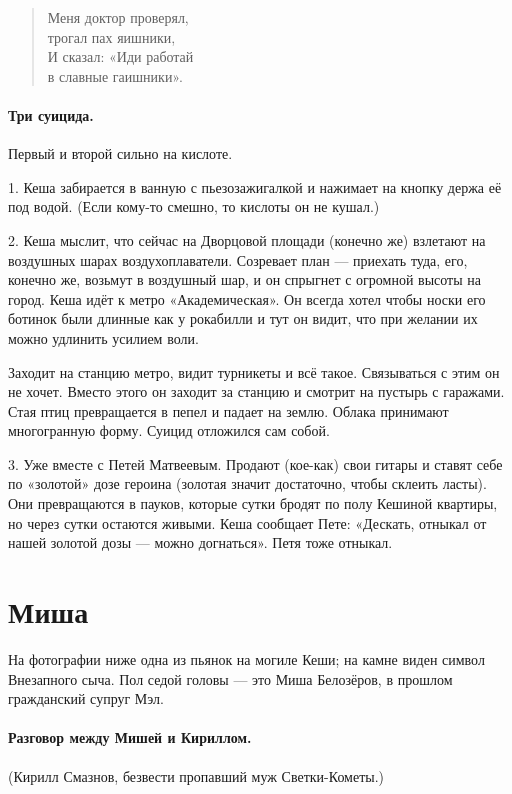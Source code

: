 \documentclass{book}
\begin{document}
\begin{verse}
Меня доктор проверял,\\
\quad  трогал пах яишники,\\
И сказал: «Иди работай\\
\quad в славные гаишники».
\end{verse}


\paragraph{Три суицида.}
Первый и второй сильно на кислоте.

1. Кеша забирается в ванную с пьезозажигалкой и нажимает на кнопку держа её под водой.
(Если кому-то смешно, то кислоты он не кушал.)

2. Кеша мыслит, что сейчас на Дворцовой площади (конечно же) взлетают на воздушных шарах воздухоплаватели.
Созревает план --- приехать туда, его, конечно же, возьмут в воздушный шар, и он спрыгнет с огромной высоты на город.
Кеша идёт к метро «Академическая».
Он всегда хотел чтобы носки его ботинок были длинные как у рокабилли и тут он видит, что при желании их можно удлинить усилием воли.

Заходит на станцию метро, видит турникеты и всё такое.
Связываться с этим он не хочет.
Вместо этого он заходит за станцию и смотрит на пустырь с гаражами.
Стая птиц превращается в пепел и падает на землю.
Облака принимают многогранную форму.
Суицид отложился сам собой.

3. Уже вместе с Петей Матвеевым.
Продают (кое-как) свои гитары и ставят себе по «золотой» дозе героина (золотая значит достаточно, чтобы склеить ласты).
Они превращаются в пауков, которые сутки бродят по полу Кешиной квартиры, но через сутки остаются живыми.
Кеша сообщает Пете: «Дескать, отныкал от нашей золотой дозы --- можно догнаться».
Петя тоже отныкал.

\section*{Миша}

На фотографии ниже одна из пьянок на могиле Кеши;
на камне виден символ Внезапного сыча.
Пол седой головы --- это Миша Белозёров, в прошлом гражданский супруг Мэл.

\paragraph{Разговор между Мишей и Кириллом.} (Кирилл Смазнов, безвести пропавший муж Светки-Кометы.)
\end{document}
